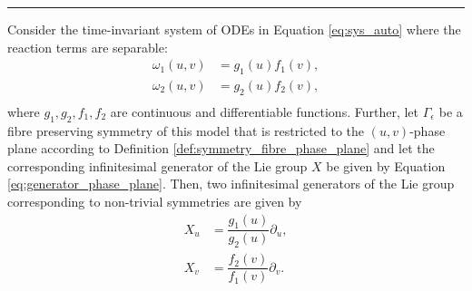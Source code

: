 \hrule
\begin{theorem}
  Consider the time-invariant system of ODEs in Equation \eqref{eq:sys_auto} where the reaction terms are separable:
  \begin{equation}
    \begin{split}
      \omega_1(u,v)&=g_1(u)f_1(v),\\
      \omega_2(u,v)&=g_2(u)f_2(v),\\      
    \end{split}
    \label{eq:sep_reac}
    \end{equation}
    where $g_1,g_2,f_1,f_2$ are continuous and differentiable functions. Further, let $\Gamma_\epsilon$ be a fibre preserving symmetry of this model that is restricted to the $(u,v)$-phase plane according to Definition \ref{def:symmetry_fibre_phase_plane} and let the corresponding infinitesimal generator of the Lie group $X$ be given by Equation \eqref{eq:generator_phase_plane}. Then, two infinitesimal generators of the Lie group corresponding to non-trivial symmetries are given by
    \begin{align}
      X_u&=\dfrac{g_1(u)}{g_2(u)}\partial_u,\label{eq:X_u}\\
      X_v&=\dfrac{f_2(v)}{f_1(v)}\partial_v.\label{eq:X_v}
     \end{align}

\label{thm:separable}
\end{theorem}
  \dotfill
